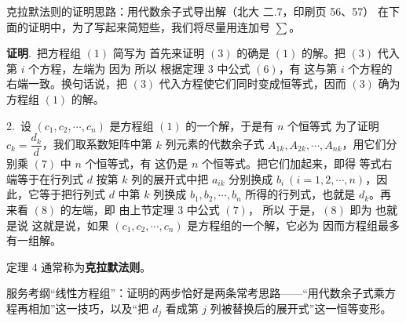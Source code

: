 \begin{fdeep}{克拉默法则的证明思路：用代数余子式导出解（北大 二.7，印刷页 56、57）}
在下面的证明中，为了写起来简短些，我们将尽量用连加号 $\sum$。

\textbf{证明}.\ 把方程组 $(1)$ 简写为
首先来证明 $(3)$ 的确是 $(1)$ 的解。把 $(3)$ 代入第 $i$ 个方程，左端为
因为
所以
根据定理 $3$ 中公式 $(6)$，有
这与第 $i$ 个方程的右端一致。换句话说，把 $(3)$ 代入方程使它们同时变成恒等式，因而 $(3)$ 确为方程组 $(1)$ 的解。

2.\ 设 $(c_1,c_2,\cdots,c_n)$ 是方程组 $(1)$ 的一个解，于是有 $n$ 个恒等式
为了证明 $c_k=\dfrac{d_k}{d}$，我们取系数矩阵中第 $k$ 列元素的代数余子式 $A_{1k},A_{2k},\cdots,A_{nk}$，用它们分别乘 $(7)$ 中 $n$ 个恒等式，有
这仍是 $n$ 个恒等式。把它们加起来，即得
等式右端等于在行列式 $d$ 按第 $k$ 列的展开式中把 $a_{ik}$ 分别换成 $b_i\ (i=1,2,\cdots,n)$，因此，它等于把行列式 $d$ 中第 $k$ 列换成 $b_1,b_2,\cdots,b_n$ 所得的行列式，也就是 $d_k$。再来看 $(8)$ 的左端，即
由上节定理 $3$ 中公式 $(7)$，
所以
于是，$(8)$ 即为
也就是说
这就是说，如果 $(c_1,c_2,\cdots,c_n)$ 是方程组的一个解，它必为
因而方程组最多有一组解。

定理 $4$ 通常称为\textbf{克拉默法则}。

\fbref{}服务考纲“线性方程组”：证明的两步恰好是两条常考思路——“用代数余子式乘方程再相加”这一技巧，以及“把 $d_j$ 看成第 $j$ 列被替换后的展开式”这一恒等变形。
\end{fdeep}

